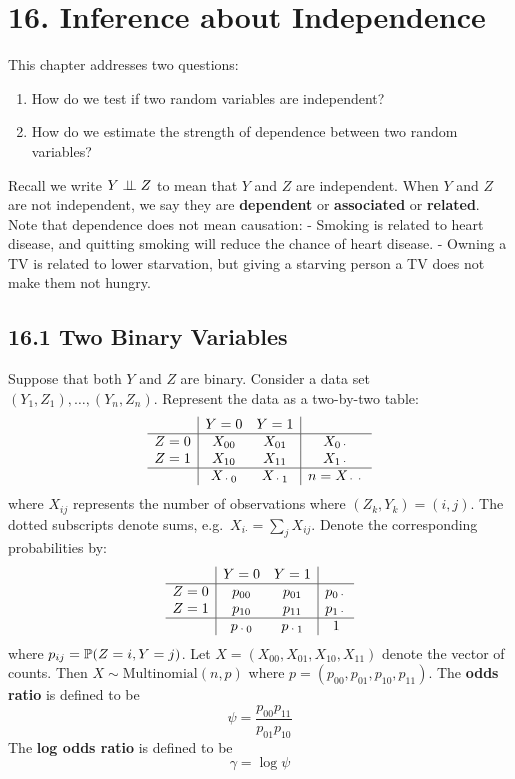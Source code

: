\section*{16. Inference about Independence}\label{inference-about-independence}
This chapter addresses two questions:
\begin{enumerate}[tightlist,label={\arabic*.}]
\item
  How do we test if two random variables are independent?
\item
  How do we estimate the strength of dependence between two random
  variables?
\end{enumerate}
Recall we write \(Y \perp\!\!\!\perp Z\) to mean that \(Y\) and \(Z\) are
independent.
When \(Y\) and \(Z\) are not independent, we say they are
\textbf{dependent} or \textbf{associated} or \textbf{related}.
Note that dependence does not mean causation: - Smoking is related to
heart disease, and quitting smoking will reduce the chance of heart
disease. - Owning a TV is related to lower starvation, but giving a
starving person a TV does not make them not hungry.

\subsection*{16.1 Two Binary Variables}\label{two-binary-variables}
Suppose that both \(Y\) and \(Z\) are binary. Consider a data set
\((Y_{1}, Z_{1}), \dots, (Y_{n}, Z_{n})\). Represent the data as a two-by-two
table:
\[
\begin{array}{c|cc|c} 
      & Y = 0  & Y = 1 & \\
\hline
Z = 0 & X_{00} & X_{01} & X_{0\text{·}}\\
Z = 1 & X_{10} & X_{11} & X_{1\text{·}}\\
 \hline
      & X_{\text{·}0} & X_{\text{·}1} & n = X_{\text{··}}
\end{array}
\]
where \(X_{ij}\) represents the number of observations where
\((Z_{k}, Y_{k}) = (i, j)\). The dotted subscripts denote sums,
e.g.~\(X_{i\text{·}} = \sum_{j} X_{ij}\). Denote the corresponding
probabilities by:
\[
\begin{array}{c|cc|c} 
      & Y = 0  & Y = 1 & \\
\hline
Z = 0 & p_{00} & p_{01} & p_{0\text{·}}\\
Z = 1 & p_{10} & p_{11} & p_{1\text{·}}\\
 \hline
      & p_{\text{·}0} & p_{\text{·}1} & 1
\end{array}
\]
where \(p_{ij} = \operatorname{\mathbb{P}}(Z = i, Y = j)\). Let
\(X = (X_{00}, X_{01}, X_{10}, X_{11})\) denote the vector of counts.
Then \(X \sim \text{Multinomial}(n, p)\) where
\(p = (p_{00}, p_{01}, p_{10}, p_{11})\).
The \textbf{odds ratio} is defined to be
\[
\psi = \frac{p_{00} p_{11}}{p_{01} p_{10}}
\]
The \textbf{log odds ratio} is defined to be
\[
\gamma = \log \psi
\]

